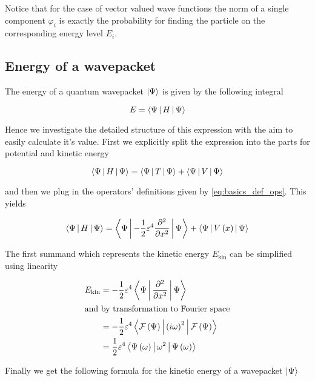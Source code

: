 Notice that for the case of vector valued wave functions the norm of a single component $\varphi_i$
is exactly the probability for finding the particle on the corresponding energy level $E_i$.


\subsection{Energy of a wavepacket}

The energy of a quantum wavepacket $\Ket{\Psi}$ is given by the following integral

\begin{equation}
  E = \Braket{\Psi | H | \Psi}
\end{equation}

Hence we investigate the detailed structure of this expression with the aim to easily
calculate it's value. First we explicitly split the expression into the parts
for potential and kinetic energy

\begin{equation} \label{eq:energy_split_Fourier}
  \Braket{\Psi | H | \Psi} = \Braket{\Psi | T | \Psi} + \Braket{\Psi | V | \Psi}
\end{equation}

and then we plug in the operators' definitions given by \eqref{eq:basics_def_ops}.
This yields

\begin{equation}
  \Braket{\Psi | H | \Psi} = \Braket{\Psi | -\frac{1}{2} \varepsilon^4 \frac{\partial^2}{\partial x^2} | \Psi}
                           + \Braket{\Psi | V\left( x \right) | \Psi}
\end{equation}

The first summand which represents the kinetic energy $E_{\text{kin}}$ can be simplified
using linearity

\begin{align*}
  E_{\text{kin}} & = -\frac{1}{2} \varepsilon^4 \Braket{\Psi | \frac{\partial^2}{\partial x^2} | \Psi} \\
  \intertext{and by transformation to Fourier space}
                 & = -\frac{1}{2} \varepsilon^4 \Braket{\mathcal{F}\left(\Psi\right) | \left(i \omega\right)^2 | \mathcal{F}\left(\Psi\right)} \\
                 & = \frac{1}{2} \varepsilon^4 \Braket{\Psi\left( \omega \right) | \omega^2 | \Psi\left( \omega \right)}
\end{align*}

Finally we get the following formula for the kinetic energy of a wavepacket $\Ket{\Psi}$


